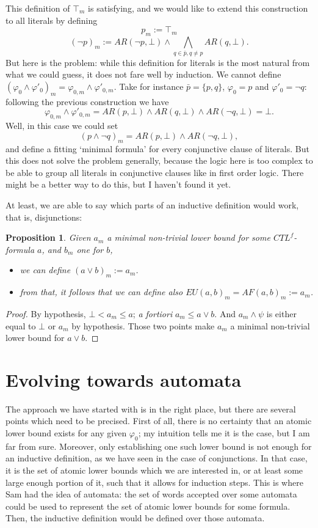 \documentclass[10pt]{article}
\newcommand{\ARp}{{AR(p,\bot)}}
\newtheorem{proposition}[definition]{Proposition}
\begin{document}
This definition of $\top_m$ is satisfying, and we would like to extend this construction to all literals by defining \[p_m:=\top_m\] \[(\neg p)_m:=AR(\neg p,\bot)\wedge\bigwedge_{q\in\bar{p},q\not=p}AR(q,\bot).\] But here is the problem: while this definition for literals is the most natural from what we could guess, it does not fare well by induction. We cannot define $(\varphi_0\wedge\varphi'_0)_m=\varphi_{0,m}\wedge\varphi'_{0,m}$. Take for instance $\bar{p}=\{p,q\}$, $\varphi_0=p$ and $\varphi'_0=\neg q$: following the previous construction we have \[\varphi_{0,m}\wedge\varphi'_{0,m}=AR(p,\bot)\wedge AR(q,\bot)\wedge AR(\neg q,\bot)=\bot.\]
Well, in this case we could set \[(p\wedge\neg q)_m = \ARp\wedge AR(\neg q,\bot),\] and define a fitting `minimal formula' for every conjunctive clause of literals. But this does not solve the problem generally, because the logic here is too complex to be able to group all literals in conjunctive clauses like in first order logic. There might be a better way to do this, but I haven't found it yet.

At least, we are able to say which parts of an inductive definition would work, that is, disjunctions:
\begin{proposition}\label{disj_m}
    Given $a_m$ a minimal non-trivial lower bound for some $CTL^f$-formula $a$, and $b_m$ one for $b$,
    \begin{itemize}
    \item[-] we can define $(a\vee b)_m:=a_m$.
    \item[-] from that, it follows that we can define also $EU(a,b)_m=AF(a,b)_m := a_m$.
    \end{itemize}
\end{proposition}
\begin{proof}
    By hypothesis, $\bot< a_m\leq a$; \emph{a fortiori} $a_m\leq a\vee b$. And $a_m\wedge\psi$ is either equal to $\bot$ or $a_m$ by hypothesis. Those two points make $a_m$ a minimal non-trivial lower bound for $a\vee b$.
\end{proof}

\section*{Evolving towards automata}
The approach we have started with is in the right place, but there are several points which need to be precised. First of all, there is no certainty that an atomic lower bound exists for any given $\varphi_0$; my intuition tells me it is the case, but I am far from sure. Moreover, only establishing one such lower bound is not enough for an inductive definition, as we have seen in the case of conjunctions. In that case, it is the set of atomic lower bounds which we are interested in, or at least some large enough portion of it, such that it allows for induction steps. This is where Sam had the idea of automata: the set of words accepted over some automata could be used to represent the set of atomic lower bounds for some formula. Then, the inductive definition would be defined over those automata.
\end{document}
